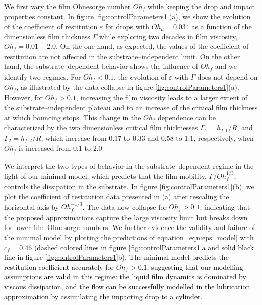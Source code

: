 \documentclass[]{jfm}
\newcommand{\revRev}[1]{\textcolor{black}{#1}}
\newcommand{\Ohd}{\mathit{Oh}_\mathit{d}}
\newcommand{\Ohf}{\mathit{Oh}_\mathit{f}}
\begin{document}
	We first vary the film Ohnesorge number $\Ohf$ while keeping the drop and impact properties constant. In figure \ref{fig:controlParameters1}(a), we show the evolution of the coefficient of restitution $\varepsilon$ for drops with $\Ohd = 0.034$ as a function of the dimensionless film thickness $\Gamma$ while exploring two decades in film viscosity, $\Ohf = 0.01 - 2.0$. On the one hand, as expected, the values of the coefficient of restitution are not affected in the substrate--independent limit. On the other hand, the substrate--dependent behavior shows the influence of $\Ohf$ and we identify two regimes. For $\Ohf < 0.1$, the evolution of $\varepsilon$ with $\Gamma$ does not depend on $\Ohf$, as illustrated by the data collapse in figure \ref{fig:controlParameters1}(a). However, for $\Ohf > 0.1$, increasing the film viscosity leads to a larger extent of the substrate--independent plateau and to an increase of the critical film thickness at which bouncing stops. This change in the $\Ohf$ dependence can be characterized by the two dimensionless critical film thicknesses $\Gamma_1 = h_{f,1}/R$, and $\Gamma_2 = h_{f,2}/R$, which increase from $0.17$ to $0.33$ and $0.58$ to $1.1$, respectively, when $\Ohf$ is increased from $0.1$ to $2.0$. 
	
	We interpret the two types of behavior in the substrate--dependent regime in the light of our minimal model, which predicts that the film mobility, $\Gamma/\Ohf^{1/3}$, controls the dissipation in the substrate. 
	In figure \ref{fig:controlParameters1}(b), we plot the coefficient of restitution data presented in (a) after rescaling the horizontal axis by $\Ohf^{-1/3}$. 
	The data now collapse for \revRev{$\Ohf > 0.1$}, indicating that the proposed approximations capture the large viscosity limit but breaks down for lower film Ohnesorge numbers. We further evidence the validity and failure of the minimal model by plotting the predictions of equation~\eqref{eqn:eps_model} with $c_f = 0.46$ (\revRev{dashed colored lines in figure \ref{fig:controlParameters1}a and solid black line in figure \ref{fig:controlParameters1}b}). \revRev{The minimal model predicts the restitution coefficient accurately for $Oh_f > 0.1$, suggesting that our modelling assumptions are valid in this regime: the liquid film dynamics is dominated by viscous dissipation, and the flow can be successfully modelled in the lubrication approximation by assimilating the impacting drop to a cylinder.}
\end{document}
